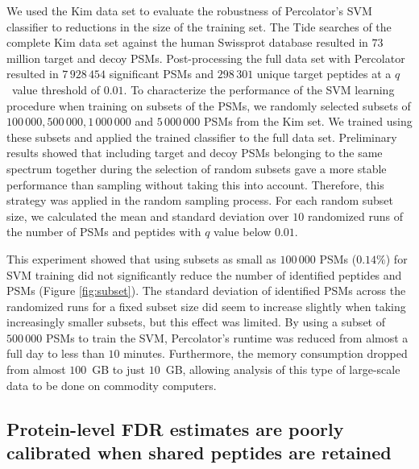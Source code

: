 \documentclass{article}
\begin{document}
We used the Kim data set to evaluate the robustness of Percolator's
SVM classifier to reductions in the size of the training set.  The
Tide searches of the complete Kim data set against the human Swissprot
database resulted in $73$ million target and decoy PSMs.
Post-processing the full data set with Percolator resulted in
$7\,928\,454$ significant PSMs and $298\,301$ unique target peptides
at a $q$~value threshold of $0.01$.  To characterize the performance
of the SVM learning procedure when training on subsets of the PSMs, we
randomly selected subsets of $100\,000, 500\,000, 1\,000\,000$ and
$5\,000\,000$ PSMs from the Kim set.  We trained using these subsets
and applied the trained classifier to the full data set. Preliminary
results showed that including target and decoy PSMs belonging to the
same spectrum together during the selection of random subsets gave a
more stable performance than sampling without taking this into
account. Therefore, this strategy was applied in the random sampling
process. For each random subset size, we calculated the mean and
standard deviation over $10$ randomized runs of the number of PSMs and
peptides with $q$ value below $0.01$.

This experiment showed that using subsets as small as $100\,000$ PSMs
($0.14\%$) for SVM training did not significantly reduce the number of
identified peptides and PSMs (Figure \ref{fig:subset}). The standard
deviation of identified PSMs across the randomized runs for a fixed
subset size did seem to increase slightly when taking increasingly
smaller subsets, but this effect was limited. By using a subset of
$500\,000$ PSMs to train the SVM, Percolator's runtime was reduced
from almost a full day to less than $10$ minutes. Furthermore, the
memory consumption dropped from almost $100$~GB to just $10$~GB,
allowing analysis of this type of large-scale data to be done on
commodity computers.

\subsection*{Protein-level FDR estimates are poorly calibrated when
  shared peptides are retained}
\end{document}
